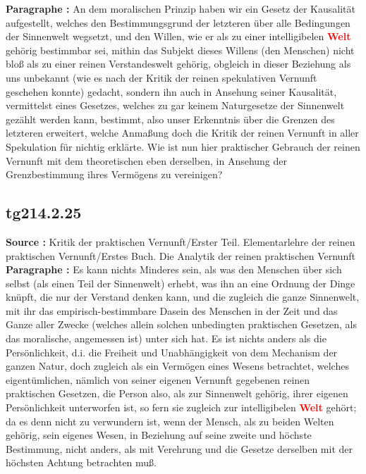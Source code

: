 \documentclass[a4paper,12pt,twoside]{book}
\newcommand{\match}[1]{\textcolor{red}{\textbf{#1}}}
\begin{document}
	\noindent\textbf{Paragraphe : }An dem moralischen Prinzip haben wir ein Gesetz der Kausalität aufgestellt, welches den Bestimmungsgrund der letzteren über alle Bedingungen der Sinnenwelt wegsetzt, und den Willen, wie er als zu einer intelligibelen \match{Welt} gehörig bestimmbar sei, mithin das Subjekt dieses Willens (den Menschen) nicht bloß als zu einer reinen Verstandeswelt gehörig, obgleich in dieser Beziehung als uns unbekannt (wie es nach der Kritik der reinen spekulativen Vernunft geschehen konnte) gedacht, sondern ihn auch in Ansehung seiner Kausalität, vermittelst eines Gesetzes, welches zu gar keinem Naturgesetze der Sinnenwelt gezählt werden kann, bestimmt, also unser Erkenntnis über die Grenzen des letzteren erweitert, welche Anmaßung doch die Kritik der reinen Vernunft in aller Spekulation für nichtig erklärte. Wie ist nun hier praktischer Gebrauch der reinen Vernunft mit dem theoretischen eben derselben, in Ansehung der Grenzbestimmung ihres Vermögens zu vereinigen? 
	
	\subsection*{tg214.2.25} 
	\textbf{Source : }Kritik der praktischen Vernunft/Erster Teil. Elementarlehre der reinen praktischen Vernunft/Erstes Buch. Die Analytik der reinen praktischen Vernunft\\  
	
	\noindent\textbf{Paragraphe : }Es kann nichts Minderes sein, als was den Menschen über sich selbst (als einen Teil der Sinnenwelt) erhebt, was ihn an eine Ordnung der Dinge knüpft, die nur der Verstand denken kann, und die zugleich die ganze Sinnenwelt, mit ihr das empirisch-bestimmbare Dasein des Menschen in der  Zeit und das Ganze aller Zwecke (welches allein solchen unbedingten praktischen Gesetzen, als das moralische, angemessen ist) unter sich hat. Es ist nichts anders als die Persönlichkeit, d.i. die Freiheit und Unabhängigkeit von dem Mechanism der ganzen Natur, doch zugleich als ein Vermögen eines Wesens betrachtet, welches eigentümlichen, nämlich von seiner eigenen Vernunft gegebenen reinen praktischen Gesetzen, die Person also, als zur Sinnenwelt gehörig, ihrer eigenen Persönlichkeit unterworfen ist, so fern sie zugleich zur intelligibelen \match{Welt} gehört; da es denn nicht zu verwundern ist, wenn der Mensch, als zu beiden Welten gehörig, sein eigenes Wesen, in Beziehung auf seine zweite und höchste Bestimmung, nicht anders, als mit Verehrung und die Gesetze derselben mit der höchsten Achtung betrachten muß. 
	
\end{document}
